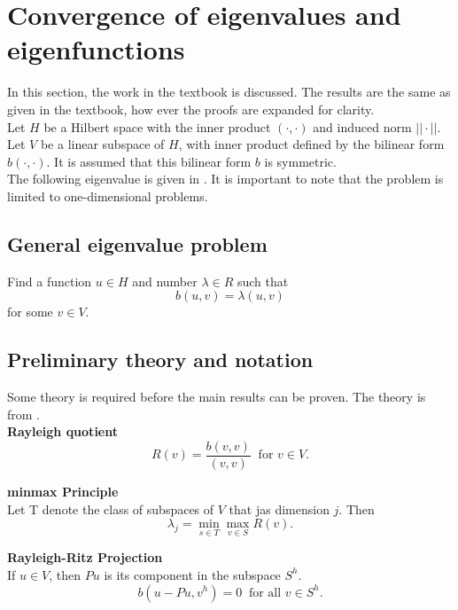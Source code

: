 \documentclass[../../main.tex]{subfiles}
\begin{document}
\section{Convergence of eigenvalues and eigenfunctions}
In this section, the work in the textbook \cite[p.228-236]{SF73} is discussed. The results are the same as given in the textbook, how ever the proofs are expanded for clarity.\\

Let $H$ be a Hilbert space with the inner product $(\cdot,\cdot)$ and induced norm $||\cdot||$. Let $V$ be a linear subspace of $H$, with inner product defined by the bilinear form $b(\cdot,\cdot)$. It is assumed that this bilinear form $b$ is symmetric.\\

The following eigenvalue is given in \cite{SF73}. It is important to note that the problem is limited to one-dimensional problems.

\subsection{General eigenvalue problem}
Find a function $u \in H$ and number $\lambda \in R$ such that
\begin{equation}
	b(u,v) = \lambda (u,v) \label{GEVP}
\end{equation} for some $v \in V$.

\subsection{Preliminary theory and notation}
Some theory is required before the main results can be proven. The theory is from \cite{SF73}.\\

\textbf{Rayleigh quotient}
\begin{equation*}
	R(v) = \frac{b(v,v)}{(v,v)} \ \text { for } v \in V.
\end{equation*} \label{sym:Rayleigh}

\textbf{minmax Principle}\\
Let T denote the class of subspaces of $V$ that jas dimension $j$. Then
\begin{equation*}
	\lambda_j = \min_{s\in T}\max_{v \in S} R(v).
\end{equation*}

\textbf{Rayleigh-Ritz Projection}\\
If $u \in V$, then $Pu$ is its component in the subspace $S^h$.
\begin{equation*}
	b(u-Pu,v^h) = 0 \ \text{ for all } v \in S^h.
\end{equation*}
\end{document}
